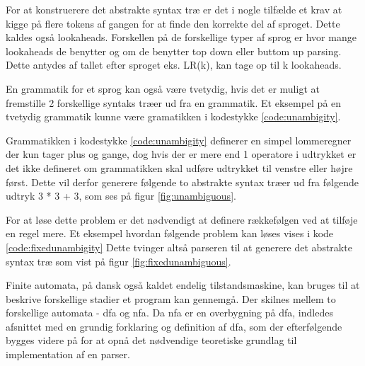 For at konstruerere det abstrakte syntax træ er det i nogle tilfælde et krav at kigge på flere tokens af gangen for at finde den korrekte del af sproget. Dette kaldes også lookaheads. Forskellen på de forskellige typer af sprog er hvor mange lookaheads de benytter og om de benytter top down eller buttom up parsing. Dette antydes af tallet efter sproget eks. LR(k), kan tage op til k lookaheads.


\noindent En grammatik for et sprog kan også være tvetydig, hvis det er muligt at fremstille 2 forskellige syntaks træer ud fra en grammatik. Et eksempel på en tvetydig grammatik kunne være gramatikken i kodestykke \ref{code:unambigity}.


\noindent Grammatikken i kodestykke \ref{code:unambigity} definerer en simpel lommeregner der kun tager plus og gange, dog hvis der er mere end 1 operatore i udtrykket er det ikke defineret om grammatikken skal udføre udtrykket til venstre eller højre først. Dette vil derfor generere følgende to abstrakte syntax træer ud fra følgende udtryk 3 * 3 + 3, som ses på figur \ref{fig:unambiguous}.


\noindent For at løse dette problem er det nødvendigt at definere rækkefølgen ved at tilføje en regel mere. Et eksempel hvordan følgende problem kan løses vises i kode \ref{code:fixedunambigity}
Dette tvinger altså parseren til at generere det abstrakte syntax træ som vist på figur \ref{fig:fixedunambiguous}.


Finite automata, på dansk også kaldet endelig tilstandsmaskine, kan bruges til at beskrive forskellige stadier et program kan gennemgå. Der skilnes mellem to forskellige automata - \gls{dfa} og \gls{nfa}. Da \gls{nfa} er en overbygning på \gls{dfa}, indledes afsnittet med en grundig forklaring og definition af \gls{dfa}, som der efterfølgende bygges videre på for at opnå det nødvendige teoretiske grundlag til implementation af en parser.\\

